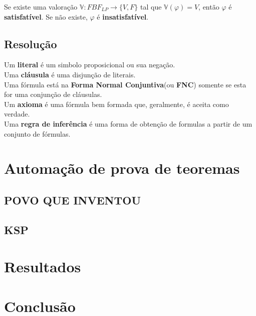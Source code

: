 \documentclass[a4paper,final,12pt]{article}
\begin{document}
	Se existe uma valoração $\mathbb{V} : FBF_{LP} \to \{V, F\}$ tal que $\mathbb{V}(\varphi) = V$, então $\varphi$ é \textbf{satisfatível}. Se não existe, $\varphi$ é \textbf{insatisfatível}.
	\subsection{Resolução}
	Um \textbf{literal} é um simbolo proposicional ou sua negação. \\
	\indent Uma \textbf{cláusula} é uma disjunção de literais. \\
	\indent Uma fórmula está na \textbf{Forma Normal Conjuntiva}(ou \textbf{FNC}) somente se esta for uma conjunção de cláusulas. \\
	\indent Um \textbf{axioma} é uma fórmula bem formada que, geralmente, é aceita como verdade. \\
	\indent Uma \textbf{regra de inferência} é uma forma de obtenção de formulas a partir de um conjunto de fórmulas.
	
	\section{Automação de prova de teoremas}
	\subsection{POVO QUE INVENTOU}
	\subsection{KSP}
	
	\section{Resultados}
	\section{Conclusão}
	
\end{document}
